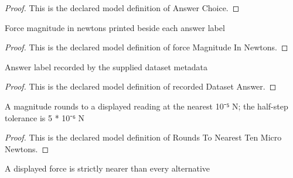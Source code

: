 \begin{proof}
  This is the declared model definition of Answer Choice.
\end{proof}
\begin{definition}
  \label{def:physics:phyx-mini-0898:phyxminiproblems-problemphyxmini0898-answerchoice-forcemagnitudeinnewtons}
  Force magnitude in newtons printed beside each answer label
\end{definition}
\begin{proof}
  This is the declared model definition of force Magnitude In Newtons.
\end{proof}
\begin{definition}
  \label{def:physics:phyx-mini-0898:phyxminiproblems-problemphyxmini0898-recordeddatasetanswer}
  Answer label recorded by the supplied dataset metadata
\end{definition}
\begin{proof}
  This is the declared model definition of recorded Dataset Answer.
\end{proof}
\begin{definition}
  \label{def:physics:phyx-mini-0898:phyxminiproblems-problemphyxmini0898-roundstonearesttenmicronewtons}
  A magnitude rounds to a displayed reading at the nearest 10⁻⁵ N; the half-step tolerance is 5 * 10⁻⁶ N
\end{definition}
\begin{proof}
  This is the declared model definition of Rounds To Nearest Ten Micro Newtons.
\end{proof}
\begin{definition}
  \label{def:physics:phyx-mini-0898:phyxminiproblems-problemphyxmini0898-isuniquenearestdisplayedforce}
  A displayed force is strictly nearer than every alternative
\end{definition}
